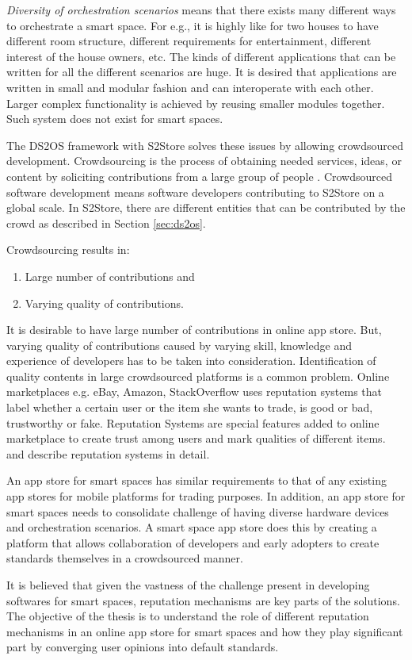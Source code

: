 \emph{Diversity of orchestration scenarios} means that there exists many different ways to orchestrate a smart space. For e.g., it is highly like for two houses to have different room structure, different requirements for entertainment, different interest of the house owners, etc. The kinds of different applications that can be written for all the different scenarios are huge. It is desired that applications are written in small and modular fashion and can interoperate with each other. Larger complex functionality is achieved by reusing smaller modules together. Such system does not exist for smart spaces.

The DS2OS framework with S2Store solves these issues by allowing crowdsourced development. Crowdsourcing is the process of obtaining needed services, ideas, or content by soliciting contributions from a large group of people \cite{pahl2014distributed}. Crowdsourced software development means software developers contributing to S2Store on a global scale. In S2Store, there are different entities that can be contributed by the crowd as described in Section \ref{sec:ds2os}.

Crowdsourcing results in:

\begin{enumerate}
  \item Large number of contributions and
  \item Varying quality of contributions.
\end{enumerate}

It is desirable to have large number of contributions in online app store. But, varying quality of contributions caused by varying skill, knowledge and experience of developers has to be taken into consideration. Identification of quality contents in large crowdsourced platforms is a common problem. Online marketplaces e.g. eBay, Amazon, StackOverflow uses reputation systems that label whether a certain user or the item she wants to trade, is good or bad, trustworthy or fake. Reputation Systems are special features added to online marketplace to create trust among users and mark qualities of different items. \cite{Resnick2000} and \cite{farmer2010building} describe reputation systems in detail.

An app store for smart spaces has similar requirements to that of any existing app stores for mobile platforms for trading purposes. In addition, an app store for smart spaces needs to consolidate challenge of having diverse hardware devices and orchestration scenarios. A smart space app store does this by creating a platform that allows collaboration of developers and early adopters to create standards themselves in a crowdsourced manner.

It is believed that given the vastness of the challenge present in developing softwares for smart spaces, reputation mechanisms are key parts of the solutions. The objective of the thesis is to understand the role of different reputation mechanisms in an online app store for smart spaces and how they play significant part by converging user opinions into default standards.